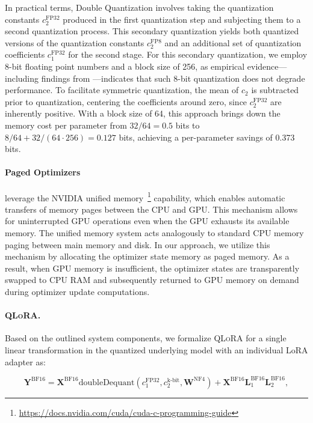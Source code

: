 In practical terms, Double Quantization involves taking the quantization constants $c_2^{\text{FP32}}$ produced in the first quantization step and subjecting them to a second quantization process. This secondary quantization yields both quantized versions of the quantization constants $c_2^{\text{FP8}}$ and an additional set of quantization coefficients $c_1^{\text{FP32}}$ for the second stage. For this secondary quantization, we employ 8-bit floating point numbers and a block size of 256, as empirical evidence—including findings from \citet{dettmers2022case}—indicates that such 8-bit quantization does not degrade performance. To facilitate symmetric quantization, the mean of $c_2$ is subtracted prior to quantization, centering the coefficients around zero, since $c_2^{\text{FP32}}$ are inherently positive. With a block size of 64, this approach brings down the memory cost per parameter from $32/64=0.5$ bits to $8/64 + 32/(64\cdot256) = 0.127$ bits, achieving a per-parameter savings of 0.373 bits.

\paragraph{Paged Optimizers} leverage the NVIDIA unified memory~\footnote{\tiny \url{https://docs.nvidia.com/cuda/cuda-c-programming-guide}} capability, which enables automatic transfers of memory pages between the CPU and GPU. This mechanism allows for uninterrupted GPU operations even when the GPU exhausts its available memory. The unified memory system acts analogously to standard CPU memory paging between main memory and disk. In our approach, we utilize this mechanism by allocating the optimizer state memory as paged memory. As a result, when GPU memory is insufficient, the optimizer states are transparently swapped to CPU RAM and subsequently returned to GPU memory on demand during optimizer update computations.

\paragraph{\textsc{QLoRA}.} Based on the outlined system components, we formalize \textsc{QLoRA} for a single linear transformation in the quantized underlying model with an individual LoRA adapter as:

\begin{equation}
    \mathbf{Y}^{\text{BF16}} =  \mathbf{X}^{\text{BF16}} \text{doubleDequant}(c_1^{\text{FP32}}, c_2^{\text{k-bit}}, \mathbf{W}^{\text{NF4}}) + \mathbf{X}^{\text{BF16}}\mathbf{L}^{\text{BF16}}_1\mathbf{L}^{\text{BF16}}_2,
\end{equation}


